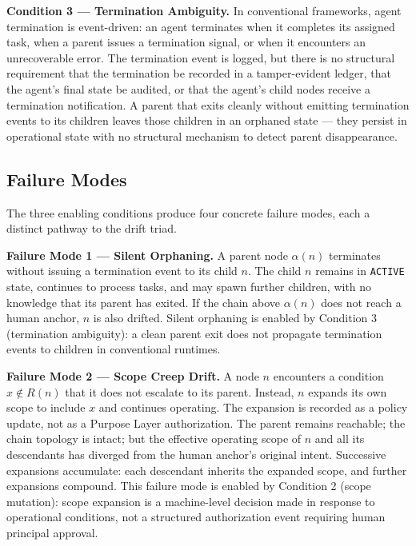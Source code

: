 \medskip
\noindent\textbf{Condition 3 — Termination Ambiguity.}
In conventional frameworks, agent termination is event-driven: an agent terminates when it completes its assigned task, when a parent issues a termination signal, or when it encounters an unrecoverable error. The termination event is logged, but there is no structural requirement that the termination be recorded in a tamper-evident ledger, that the agent's final state be audited, or that the agent's child nodes receive a termination notification. A parent that exits cleanly without emitting termination events to its children leaves those children in an orphaned state — they persist in operational state with no structural mechanism to detect parent disappearance.

\subsection{Failure Modes}
\label{sec:rs-drift-failure-modes}

The three enabling conditions produce four concrete failure modes, each a distinct pathway to the drift triad.

\medskip
\noindent\textbf{Failure Mode 1 — Silent Orphaning.}
A parent node $\alpha(n)$ terminates without issuing a termination event to its child $n$. The child $n$ remains in \texttt{ACTIVE} state, continues to process tasks, and may spawn further children, with no knowledge that its parent has exited. If the chain above $\alpha(n)$ does not reach a human anchor, $n$ is also drifted. Silent orphaning is enabled by Condition 3 (termination ambiguity): a clean parent exit does not propagate termination events to children in conventional runtimes.

\medskip
\noindent\textbf{Failure Mode 2 — Scope Creep Drift.}
A node $n$ encounters a condition $x \notin R(n)$ that it does not escalate to its parent. Instead, $n$ expands its own scope to include $x$ and continues operating. The expansion is recorded as a policy update, not as a Purpose Layer authorization. The parent remains reachable; the chain topology is intact; but the effective operating scope of $n$ and all its descendants has diverged from the human anchor's original intent. Successive expansions accumulate: each descendant inherits the expanded scope, and further expansions compound. This failure mode is enabled by Condition 2 (scope mutation): scope expansion is a machine-level decision made in response to operational conditions, not a structured authorization event requiring human principal approval.

